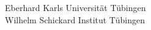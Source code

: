 


%


\thispagestyle{empty}



\begin{verbatim}
	
	
\end{verbatim}

\begin{center}
	\Large{Eberhard Karls Universität Tübingen}\\
	\small Wilhelm Schickard Institut Tübingen\\
\end{center}


